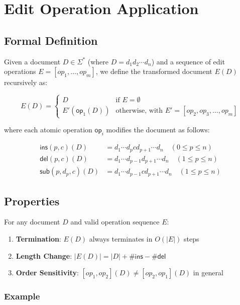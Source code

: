 \documentclass{article}
\begin{document}
\section{Edit Operation Application}
\label{sec:edit-application}

\subsection{Formal Definition}

Given a document $D \in \Sigma^*$ (where $D = d_1d_2\cdots d_n$) and a sequence of edit operations $E = [op_1, \ldots, op_m]$, we define the transformed document $E(D)$ recursively as:

\[E(D) = 
\begin{cases}
D & \text{if } E = \emptyset \\
E'(\mathsf{op}_1(D)) & \text{otherwise, with } E' = [op_2, op_3, \ldots, op_m]
\end{cases}
\]

where each atomic operation $\mathsf{op}_i$ modifies the document as follows:

\begin{align*}
\mathsf{ins}(p,c)(D) &= d_1\cdots d_p c d_{p+1}\cdots d_n \quad (0 \leq p \leq n) \\
\mathsf{del}(p, c)(D) &= d_1\cdots d_{p-1} d_{p+1}\cdots d_n \quad (1 \leq p \leq n) \\
\mathsf{sub}(p,d_p, c)(D) &= d_1\cdots d_{p-1} c d_{p+1}\cdots d_n \quad (1 \leq p \leq n)
\end{align*}

\subsection{Properties}

\begin{center}
	For any document $D$ and valid operation sequence $E$:
	\begin{enumerate}
		\item \textbf{Termination}: $E(D)$ always terminates in $O(|E|)$ steps
		\item \textbf{Length Change}: $|E(D)| = |D| + \#\mathsf{ins} - \#\mathsf{del}$
		\item \textbf{Order Sensitivity}: $[op_1, op_2](D) \neq [op_2, op_1](D)$ in general
	\end{enumerate}
\end{center}

\subsubsection{Example}
\end{document}
